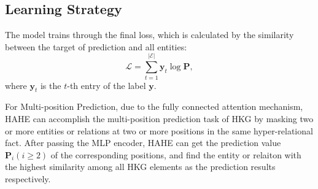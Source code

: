 \documentclass[11pt]{article}
\begin{document}
\subsection{Learning Strategy}
\label{LS}

The model trains through the final loss, which is calculated by the similarity between the target of prediction and all entities:
\begin{equation}
\mathcal{L}=\sum_{t=1}^{|\mathcal{E}|}{\mathbf{y}_t\log \boldsymbol{P}},
\end{equation}
where $\mathbf{y}_t$ is the $t$-th entry of the label $\mathbf{y}$. 

For Multi-position Prediction, due to the fully connected attention mechanism, HAHE can accomplish the multi-position prediction task of HKG by masking two or more entities or relations at two or more positions in the same hyper-relational fact. After passing the MLP encoder, HAHE can get the prediction value $\boldsymbol{P}_i(i\geq 2)$ of the corresponding positions, and find the entity or relaiton with the highest similarity among all HKG elements as the prediction results respectively.
\end{document}
